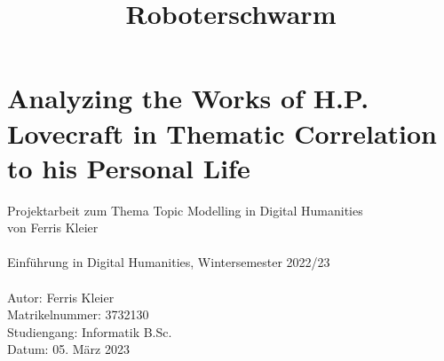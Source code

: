 \documentclass[11pt]{article}
\title{Roboterschwarm}
\begin{document}
     \section*{Analyzing the Works of H.P. Lovecraft in Thematic Correlation to his Personal Life}
    Projektarbeit zum Thema Topic Modelling in Digital Humanities
    \\von Ferris Kleier\\\\
    Einführung in Digital Humanities, Wintersemester 2022/23\\\\
    Autor: Ferris Kleier\\
    Matrikelnummer: 3732130\\
    Studiengang: Informatik B.Sc.\\
    Datum: 05. März 2023

    
    
    
    
    
    
    
    
    
\end{document}
